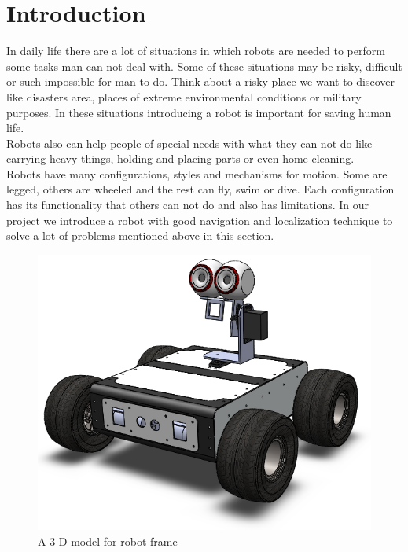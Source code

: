 \documentclass[12pt]{article}
\begin{document}
\section{Introduction}
 In daily life there are a lot of situations in which robots are needed to perform some tasks man can not deal with. Some of these situations may be risky, difficult or such impossible for man to do. Think about a risky place we want to discover like disasters area, places of extreme environmental conditions or military purposes. In these situations introducing a robot is important for saving human life.\\
 Robots also can help people of special needs with what they can not do like carrying heavy things, holding and placing parts or even home cleaning.\\
 Robots have many configurations, styles and mechanisms for motion. Some are legged, others are wheeled and the rest can fly, swim or dive. Each configuration has its functionality that others can not do and also has limitations.
 In our project we introduce a robot with good navigation and localization technique to solve a lot of problems mentioned above in this section. 

\begin{figure}[h]
\centering
\includegraphics[width =.4\textwidth]{Fig/Introduction.png}
\caption{ A 3-D model for robot frame}
\end{figure}

\end{document}

